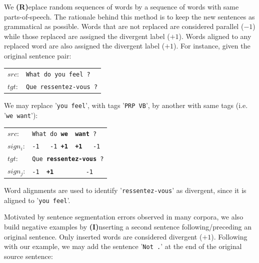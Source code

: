 \documentclass[11pt,a4paper]{article}
\begin{document}
We {\bf (R)}eplace random sequences of words by a sequence of words with same parts-of-speech. 
The rationale behind this method is to keep the new sentences as grammatical as possible. 
Words that are not replaced are considered parallel ($-1$) while those replaced are assigned the divergent label ($+1$). 
Words aligned to any replaced word are also assigned the divergent label ($+1$). For instance, given the original sentence pair:

\begin{table}[h]
\small
\center
\begin{tabular}{ll}
$src$: & { \small \texttt{What do you feel ?}} \\
$tgt$: & { \small \texttt{Que ressentez-vous ?}} \\
\end{tabular}
\end{table}

We may replace '\texttt{you feel}', with tags '\texttt{PRP VB}', by another with same tags (i.e. '\texttt{we want}'):

\begin{table}[h]
\small
\center
\begin{tabular}{ll}
$src$: & { \small \texttt{What do {\bf we \ want} ?}} \\
$sign_i$: & { \small \texttt{-1 \ \  -1 {\bf +1\ \ +1} \ \  -1}} \\
$tgt$: & { \small \texttt{Que {\bf ressentez-vous} ?}} \\
$sign_j$: & { \small \texttt{-1\ \ {\bf +1}\ \ \ \ \ \ \ \ \ -1}} \\
\end{tabular}
\end{table}

Word alignments are used to identify '\texttt{ressentez-vous}' as divergent, since it is aligned to '\texttt{you feel}'.

Motivated by sentence segmentation errors observed in many corpora, we also build negative examples by {\bf (I)}nserting a second sentence following/preceding an %
original sentence. Only inserted words are considered divergent ($+1$).
Following with our example, we may add the sentence '\texttt{Not .}' at the end of the original source sentence:
\end{document}
